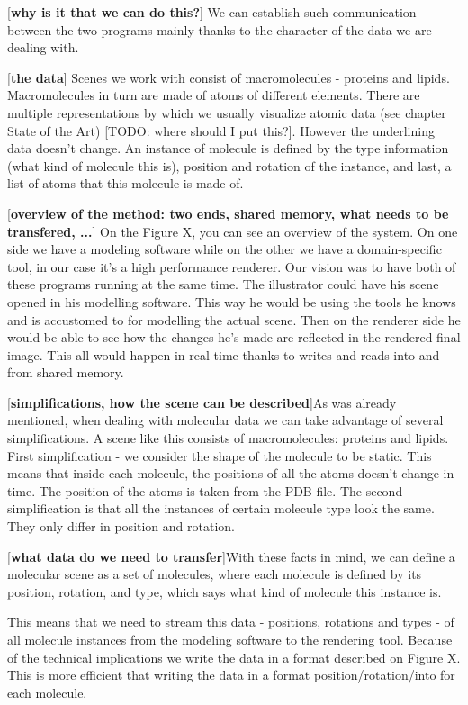 \documentclass[
  digital, %
  table,   %
  nolof,     %
  nolot,     %
]{fithesis3}
\begin{document}
[\textbf{why is it that we can do this?}]
We can establish such communication between the two programs mainly thanks to the character of the data we are dealing with.

[\textbf{the data}]
Scenes we work with consist of macromolecules - proteins and lipids. Macromolecules in turn are made of atoms of different elements. There are multiple representations by which we usually visualize atomic data (see chapter State of the Art) [TODO: where should I put this?]. However the underlining data doesn't change. An instance of molecule is defined by the type information (what kind of molecule this is), position and rotation of the instance, and last, a list of atoms that this molecule is made of.


[\textbf{overview of the method: two ends, shared memory, what needs to be transfered, ...}]
On the Figure X, you can see an overview of the system. On one side we have a modeling software while on the other we have a domain-specific tool, in our case it's a high performance renderer. Our vision was to have both of these programs running at the same time. The illustrator could have his scene opened in his modelling software. This way he would be using the tools he knows and is accustomed to for modelling the actual scene. Then on the renderer side he would be able to see how the changes he's made are reflected in the rendered final image. This all would happen in real-time thanks to writes and reads into and from shared memory.

[\textbf{simplifications, how the scene can be described}]As was already mentioned, when dealing with molecular data we can take advantage of several simplifications. A scene like this consists of macromolecules: proteins and lipids. First simplification - we consider the shape of the molecule to be static. This means that inside each molecule, the positions of all the atoms doesn't change in time. The position of the atoms is taken from the PDB file. The second simplification is that all the instances of certain molecule type look the same. They only differ in position and rotation.

[\textbf{what data do we need to transfer}]With these facts in mind, we can define a molecular scene as a set of molecules, where each molecule is defined by its position, rotation, and type, which says what kind of molecule this instance is.

This means that we need to stream this data - positions, rotations and types - of all molecule instances from the modeling software to the rendering tool. Because of the technical implications we write the data in a format described on Figure X. This is more efficient that writing the data in a format position/rotation/into for each molecule.
\end{document}
